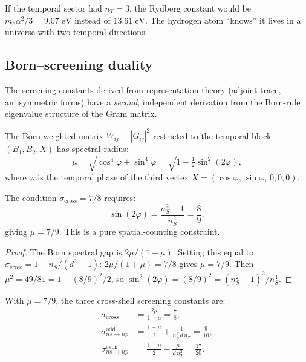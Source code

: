 If the temporal sector had $n_T = 3$, the Rydberg constant would be $m_e\alpha^2/3 = 9.07\;\text{eV}$ instead of $13.61\;\text{eV}$.  The hydrogen atom ``knows'' it lives in a universe with two temporal directions.

\subsection{Born--screening duality}
\label{sec:born_screening}

The screening constants derived from representation theory (adjoint trace, antisymmetric forms) have a \emph{second}, independent derivation from the Born-rule eigenvalue structure of the Gram matrix.

\begin{definition}
The Born-weighted matrix $W_{ij} = |G_{ij}|^2$ restricted to the temporal block $(B_1, B_2, X)$ has spectral radius:
\begin{equation}
\mu = \sqrt{\cos^4\varphi + \sin^4\varphi} = \sqrt{1 - \tfrac{1}{2}\sin^2(2\varphi)},
\end{equation}
where $\varphi$ is the temporal phase of the third vertex $X = (\cos\varphi,\,\sin\varphi,\,0,0,0)$.
\end{definition}

\begin{theorem}
\label{thm:born_phase}
The condition $\sigma_\text{cross} = 7/8$ requires:
\begin{equation}
\boxed{\sin(2\varphi) = \frac{n_S^2-1}{n_S^2} = \frac{8}{9},}
\end{equation}
giving $\mu = 7/9$.  This is a pure spatial-counting constraint.
\end{theorem}
\begin{proof}
The Born spectral gap is $2\mu/(1\!+\!\mu)$.  Setting this equal to $\sigma_\text{cross} = 1 - n_S/(d^2\!-\!1)$: $2\mu/(1\!+\!\mu) = 7/8$ gives $\mu = 7/9$.  Then $\mu^2 = 49/81 = 1 - (8/9)^2/2$, so $\sin^2(2\varphi) = (8/9)^2 = (n_S^2\!-\!1)^2/n_S^4$.
\end{proof}

\begin{theorem}[Born--screening duality at $d=5$]
\label{thm:born_screening}
With $\mu = 7/9$, the three cross-shell screening constants are:
\begin{align}
\sigma_\text{cross} &= \frac{2\mu}{1+\mu} = \frac{7}{8}, \label{eq:born_cross}\\[3pt]
\sigma_{ns\to np}^\text{odd} &= \frac{1+\mu}{2} + \frac{1}{n_S^2\,d\,n_T} = \frac{9}{10}, \label{eq:born_odd}\\[3pt]
\sigma_{ns\to np}^\text{even} &= \frac{1+\mu}{2} - \frac{\mu}{d\,n_T^2} = \frac{17}{20}. \label{eq:born_even}
\end{align}
\end{theorem}

